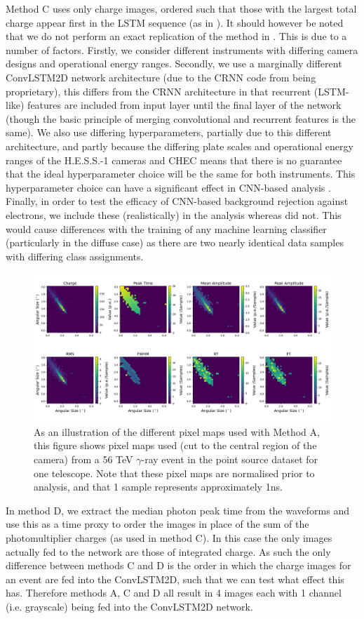 Method C uses only charge images, ordered such that those with the largest total charge appear first in the LSTM sequence (as in \cite{Shilon}). It should however be noted that we do not perform an exact replication of the method in \cite{Shilon}. This is due to a number of factors. Firstly, we consider different instruments with differing camera designs and operational energy ranges. Secondly, we use a marginally different ConvLSTM2D network architecture (due to the CRNN code from \cite{Shilon} being proprietary), this differs from the CRNN architecture in that recurrent (LSTM-like) features are included from input layer until the final layer of the network (though the basic principle of merging convolutional and recurrent features is the same). We also use differing hyperparameters, partially due to this different architecture, and partly because the differing plate scales and operational energy ranges of the H.E.S.S.-1 cameras and CHEC means that there is no guarantee that the ideal hyperparameter choice will be the same for both instruments. This hyperparameter choice can have a significant effect in CNN-based analysis \cite{hyperopt}. Finally, in order to test the efficacy of CNN-based background rejection against electrons, we include these (realistically) in the analysis whereas \cite{Shilon} did not. This would cause differences with the training of any machine learning classifier (particularly in the diffuse case) as there are two nearly identical data samples with differing class assignments.

\begin{figure}[ht]
  \centering
  \includegraphics[width=\textwidth]{figures/56tgamma.png}
  \caption{As an illustration of the different pixel maps used with Method A, this figure shows pixel maps used (cut to the central region of the camera) from a 56 TeV $\gamma$-ray event in the point source dataset for one telescope. Note that these pixel maps are normalised prior to analysis, and that 1 sample represents approximately 1ns.}
  \label{fig:wfplot}
\end{figure}
In method D, we extract the median photon peak time from the waveforms and use this as a time proxy to order the images in place of the sum of the photomultiplier charges (as used in method C). In this case the only images actually fed to the network are those of integrated charge. As such the only difference between methods C and D is the order in which the charge images for an event are fed into the ConvLSTM2D, such that we can test what effect this has. Therefore methods A, C and D all result in 4 images each with 1 channel (i.e. grayscale) being fed into the ConvLSTM2D network.

